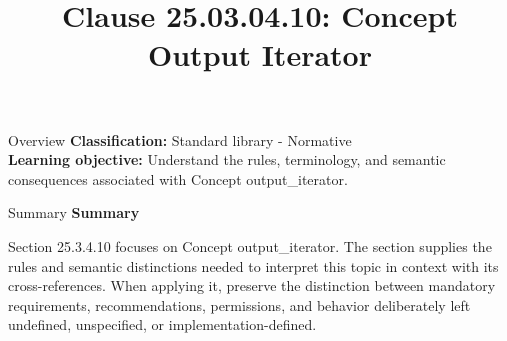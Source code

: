 \documentclass[10pt,letterpaper]{article}
\title{Clause 25.03.04.10: Concept Output Iterator}
\author{}
\date{}
\begin{document}
\maketitle
\begin{CornellOverviewBox}{Overview}
\textbf{Classification:} Standard library - Normative\\[2pt]
\textbf{Learning objective:} Understand the rules, terminology, and semantic consequences associated with Concept output\_iterator.
\end{CornellOverviewBox}\begin{CornellSummaryBox}{Summary}
{\sffamily\bfseries\color{Accent} Summary}\par\vspace{3pt}Section 25.3.4.10 focuses on Concept output\_iterator. The section supplies the rules and semantic distinctions needed to interpret this topic in context with its cross-references. When applying it, preserve the distinction between mandatory requirements, recommendations, permissions, and behavior deliberately left undefined, unspecified, or implementation-defined.
\end{CornellSummaryBox}
\end{document}
